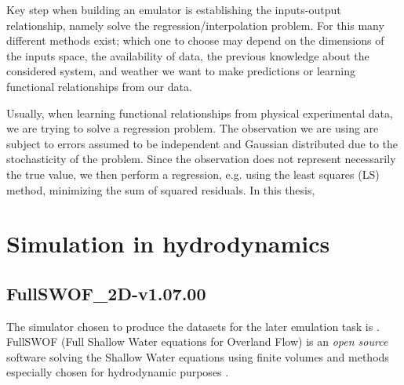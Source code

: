 Key step when building an emulator is establishing the inputs-output relationship, namely solve the regression/interpolation problem.
For this many different methods exist; which one to choose may depend on the dimensions of the inputs space, the availability of data, the previous knowledge about the considered system, and weather we want to make predictions or learning functional relationships from our data.

Usually, when learning functional relationships from physical experimental data, we are trying to solve a regression problem.
The observation we are using are subject to errors assumed to be independent and Gaussian distributed due to the stochasticity of the problem.
Since the observation does not represent necessarily the true value, we then perform a regression, e.g. using the least squares (LS) method, minimizing the sum of squared residuals.
In this thesis, 



\section{Simulation in hydrodynamics}



\subsection{FullSWOF\_2D-v1.07.00}


The simulator chosen to produce the datasets for the later emulation task is . FullSWOF (Full Shallow Water equations for Overland Flow) is an \emph{open source} software solving the Shallow Water equations using finite volumes and methods especially chosen for hydrodynamic purposes \autocite{the_fullswof_team_fullswof_2018}.\\

